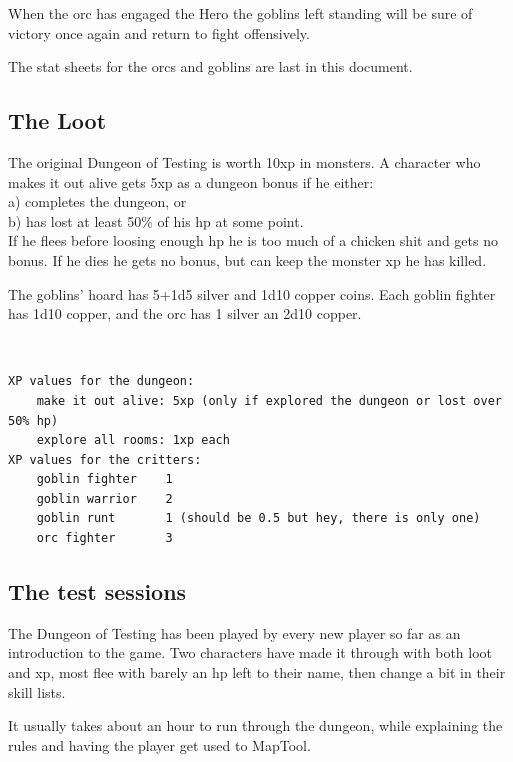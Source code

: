 When the orc has engaged the Hero the goblins left standing will be sure of victory once again and return to fight offensively.

The stat sheets for the orcs and goblins are last in this document.




\subsection*{The Loot}

The original Dungeon of Testing is worth 10xp in monsters. A character who makes it out alive gets 5xp as a dungeon bonus if he either: \\
a) completes the dungeon, or \\
b) has lost at least 50\% of his hp at some point. \\
If he flees before loosing enough hp he is too much of a chicken shit and gets no bonus. If he dies he gets no bonus, but can keep the monster xp he has killed.

The goblins' hoard has 5+1d5 silver and 1d10 copper coins.
Each goblin fighter has 1d10 copper, and the orc has 1 silver an 2d10 copper.

\

\begin{samepage} \small \begin{verbatim}
XP values for the dungeon:
    make it out alive: 5xp (only if explored the dungeon or lost over 50% hp)
    explore all rooms: 1xp each
XP values for the critters:
    goblin fighter    1
    goblin warrior    2
    goblin runt       1 (should be 0.5 but hey, there is only one)
    orc fighter       3
\end{verbatim} \normalsize \end{samepage}



\subsection*{The test sessions}

The Dungeon of Testing has been played by every new player so far as an introduction to the game. Two characters have made it through with both loot and xp, most flee with barely an hp left to their name, then change a bit in their skill lists.

It usually takes about an hour to run through the dungeon, while explaining the rules and having the player get used to MapTool. 









